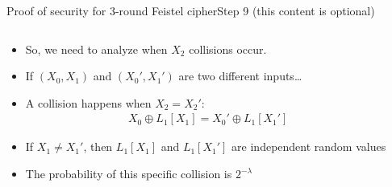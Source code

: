 \documentclass[aspectratio=169, lualatex, handout]{beamer}
\begin{document}
	\begin{frame}{Proof of security for 3-round Feistel cipher}{Step 9 (this content is optional)}
		\begin{columns}[c]
			\begin{column}{0.6\textwidth}
				\begin{itemize}[<+->]
					\item So, we need to analyze when $X_2$ collisions occur.
					\item If $(X_0, X_1)$ and $(X_0', X_1')$ are two different inputs\ldots
					\item A collision happens when $X_2 = X_2'$:
					      \begin{align*}
						      X_0 \oplus L_1[X_1] = X_0' \oplus L_1[X_1']
					      \end{align*}
					\item If $X_1 \neq X_1'$, then $L_1[X_1]$ and $L_1[X_1']$ are independent random values
					\item The probability of this specific collision is $2^{-\lambda}$
				\end{itemize}
			\end{column}
			\begin{column}{0.4\textwidth}
				\vspace{-1.5cm}
				\begin{center}
				\end{center}
			\end{column}
		\end{columns}
	\end{frame}
\end{document}
